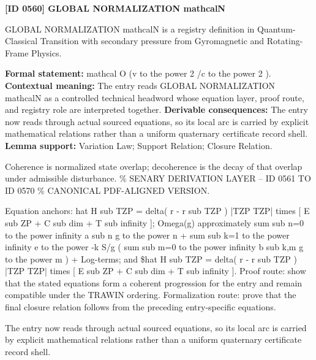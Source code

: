 \clearpage
\noindent\textbf{[ID 0560] GLOBAL NORMALIZATION mathcalN}\par
\vspace{0.35em}
\begingroup\small
{}
GLOBAL NORMALIZATION mathcalN is a registry definition in Quantum-Classical Transition with secondary pressure from Gyromagnetic and Rotating-Frame Physics.

\begingroup\footnotesize\setlength{\emergencystretch}{3em}\sloppy
\textbf{Formal statement:} mathcal O (v to the power 2 /c to the power 2 ). \textbf{Contextual meaning:} The entry reads GLOBAL NORMALIZATION mathcalN as a controlled technical headword whose equation layer, proof route, and registry role are interpreted together. \textbf{Derivable consequences:} The entry now reads through actual sourced equations, so its local arc is carried by explicit mathematical relations rather than a uniform quaternary certificate record shell. \textbf{Lemma support:} Variation Law; Support Relation; Closure Relation.\par
\endgroup

Coherence is normalized state overlap; decoherence is the decay of that overlap under admissible disturbance. \% SENARY DERIVATION LAYER -- ID 0561 TO ID 0570 \% CANONICAL PDF-ALIGNED VERSION.

Equation anchors: hat H sub TZP = delta( r - r sub TZP ) |TZP TZP| times [ E sub ZP + C sub dim + T sub infinity ]; Omega(g) approximately sum sub n=0 to the power infinity a sub n g to the power n + sum sub k=1 to the power infinity e to the power -k S/g ( sum sub m=0 to the power infinity b sub k,m g to the power m ) + Log-terms; and \$hat H sub TZP = delta( r - r sub TZP ) |TZP TZP| times [ E sub ZP + C sub dim + T sub infinity ]. Proof route: show that the stated equations form a coherent progression for the entry and remain compatible under the TRAWIN ordering. Formalization route: prove that the final closure relation follows from the preceding entry-specific equations.

The entry now reads through actual sourced equations, so its local arc is carried by explicit mathematical relations rather than a uniform quaternary certificate record shell.
\endgroup

